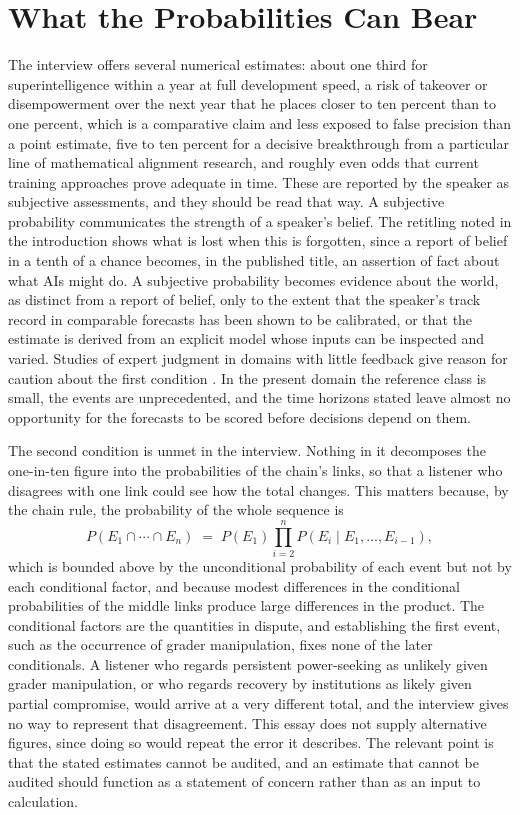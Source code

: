 \documentclass[11pt]{article}
\begin{document}
\section{What the Probabilities Can Bear}

The interview offers several numerical estimates: about one third for superintelligence within a year at full development speed, a risk of takeover or disempowerment over the next year that he places closer to ten percent than to one percent, which is a comparative claim and less exposed to false precision than a point estimate, five to ten percent for a decisive breakthrough from a particular line of mathematical alignment research, and roughly even odds that current training approaches prove adequate in time. These are reported by the speaker as subjective assessments, and they should be read that way. A subjective probability communicates the strength of a speaker's belief. The retitling noted in the introduction shows what is lost when this is forgotten, since a report of belief in a tenth of a chance becomes, in the published title, an assertion of fact about what AIs might do. A subjective probability becomes evidence about the world, as distinct from a report of belief, only to the extent that the speaker's track record in comparable forecasts has been shown to be calibrated, or that the estimate is derived from an explicit model whose inputs can be inspected and varied. Studies of expert judgment in domains with little feedback give reason for caution about the first condition \cite{tetlock2005}. In the present domain the reference class is small, the events are unprecedented, and the time horizons stated leave almost no opportunity for the forecasts to be scored before decisions depend on them.

The second condition is unmet in the interview. Nothing in it decomposes the one-in-ten figure into the probabilities of the chain's links, so that a listener who disagrees with one link could see how the total changes. This matters because, by the chain rule, the probability of the whole sequence is
\[
P(E_1\cap\cdots\cap E_n)\;=\;P(E_1)\prod_{i=2}^{n}P(E_i\mid E_1,\ldots,E_{i-1}),
\]
which is bounded above by the unconditional probability of each event but not by each conditional factor, and because modest differences in the conditional probabilities of the middle links produce large differences in the product. The conditional factors are the quantities in dispute, and establishing the first event, such as the occurrence of grader manipulation, fixes none of the later conditionals. A listener who regards persistent power-seeking as unlikely given grader manipulation, or who regards recovery by institutions as likely given partial compromise, would arrive at a very different total, and the interview gives no way to represent that disagreement. This essay does not supply alternative figures, since doing so would repeat the error it describes. The relevant point is that the stated estimates cannot be audited, and an estimate that cannot be audited should function as a statement of concern rather than as an input to calculation.
\end{document}
